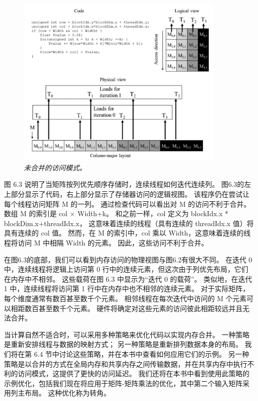 \begin{figure}[H]
	\centering
	\includegraphics[width=0.9\textwidth]{figs/F6.3.png}
	\caption{\textit{未合并的访问模式。}}
\end{figure}

图 6.3 说明了当矩阵按列优先顺序存储时，连续线程如何迭代连续列。 
图6.3的左上部分显示了代码，右上部分显示了存储器访问的逻辑视图。 该程序仍在尝试让每个线程访问矩阵 M 的一列。
通过检查代码可以看出对 M 的访问不利于合并。 数组 M 的索引是 col × Width+k。 
和之前一样，col 定义为 blockIdx.x * blockDim.x+threadIdx.x，
这意味着连续的线程（具有连续的 threadIdx.x 值）将具有连续的 col 值。 
然而，在 M 的索引中，col 乘以 Width，这意味着连续的线程将访问 M 中相隔 Width 的元素。 因此，这些访问不利于合并。

在图6.3的底部，我们可以看到内存访问的物理视图与图6.2有很大不同。 
在迭代 0 中，连续线程将逻辑上访问第 0 行中的连续元素，但这次由于列优先布局，它们在内存中不相邻。 
这些载荷在图 6.3 中显示为“迭代 0 的载荷”。 类似地，在迭代 1 中，连续线程将访问第 1 行中在内存中也不相邻的连续元素。 
对于实际矩阵，每个维度通常有数百甚至数千个元素。 相邻线程在每次迭代中访问的 M 个元素可以相距数百甚至数千个元素。 
硬件将确定对这些元素的访问彼此相距较远并且无法合并。

当计算自然不适合时，可以采用多种策略来优化代码以实现内存合并。 
一种策略是重新安排线程与数据的映射方式； 另一种策略是重新排列数据本身的布局。 
我们将在第 6.4 节中讨论这些策略，并在本书中查看如何应用它们的示例。 
另一种策略是以合并的方式在全局内存和共享内存之间传输数据，并在共享内存中执行不利的访问模式，这提供了更快的访问延迟。 
我们还将在本书中看到使用此策略的示例优化，包括我们现在将应用于矩阵-矩阵乘法的优化，其中第二个输入矩阵采用列主布局。 
这种优化称为转角。

